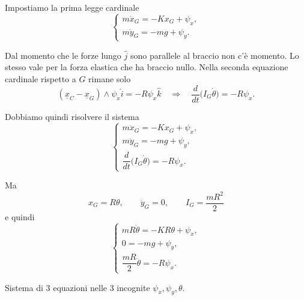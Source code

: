 \begin{example}{}
Impostiamo la prima legge cardinale
\[
\begin{cases}
m\ddot{x}_G=-Kx_G+\psi_x,\\[4pt]
m\ddot{y}_G=-mg+\psi_y.
\end{cases}
\]

Dal momento che le forze lungo \(\hat{j}\) sono parallele al braccio non c'è
momento. Lo stesso vale per la forza elastica che ha braccio nullo.
Nella seconda equazione cardinale rispetto a \(G\) rimane solo
\[
(\underline{x}_C-\underline{x}_G)\wedge \psi_x\hat{i}
=
-R\psi_x\hat{k}
\quad \Rightarrow \quad
\frac{d}{dt}\bigl(I_G\dot{\theta}\bigr)=-R\psi_x.
\]

Dobbiamo quindi risolvere il sistema
\[
\begin{cases}
m\ddot{x}_G=-Kx_G+\psi_x,\\[4pt]
m\ddot{y}_G=-mg+\psi_y,\\[4pt]
\dfrac{d}{dt}\bigl(I_G\dot{\theta}\bigr)=-R\psi_x.
\end{cases}
\]

Ma
\[
x_G=R\theta,\qquad \ddot{y}_G=0,\qquad I_G=\frac{mR^2}{2}
\]
e quindi
\[
\begin{cases}
mR\ddot{\theta}=-KR\theta+\psi_x,\\[4pt]
0=-mg+\psi_y,\\[4pt]
\dfrac{mR}{2}\ddot{\theta}=-R\psi_x.
\end{cases}
\]

Sistema di \(3\) equazioni nelle \(3\) incognite \(\psi_x,\psi_y,\theta\).
\end{example}


